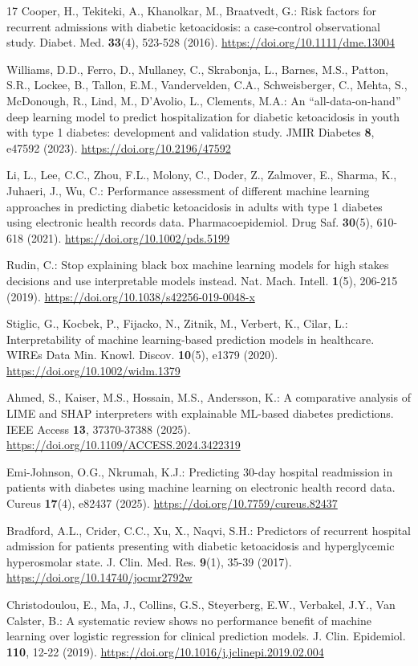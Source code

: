 \documentclass[pdflatex,sn-basic,Numbered]{sn-jnl}
\begin{document}
\begin{thebibliography}{17}
 Cooper, H., Tekiteki, A., Khanolkar, M., Braatvedt, G.: Risk factors for recurrent admissions with diabetic ketoacidosis: a case-control observational study. Diabet. Med. \textbf{33}(4), 523-528 (2016). \url{https://doi.org/10.1111/dme.13004}

 Williams, D.D., Ferro, D., Mullaney, C., Skrabonja, L., Barnes, M.S., Patton, S.R., Lockee, B., Tallon, E.M., Vandervelden, C.A., Schweisberger, C., Mehta, S., McDonough, R., Lind, M., D'Avolio, L., Clements, M.A.: An ``all-data-on-hand'' deep learning model to predict hospitalization for diabetic ketoacidosis in youth with type 1 diabetes: development and validation study. JMIR Diabetes \textbf{8}, e47592 (2023). \url{https://doi.org/10.2196/47592}

 Li, L., Lee, C.C., Zhou, F.L., Molony, C., Doder, Z., Zalmover, E., Sharma, K., Juhaeri, J., Wu, C.: Performance assessment of different machine learning approaches in predicting diabetic ketoacidosis in adults with type 1 diabetes using electronic health records data. Pharmacoepidemiol. Drug Saf. \textbf{30}(5), 610-618 (2021). \url{https://doi.org/10.1002/pds.5199}

 Rudin, C.: Stop explaining black box machine learning models for high stakes decisions and use interpretable models instead. Nat. Mach. Intell. \textbf{1}(5), 206-215 (2019). \url{https://doi.org/10.1038/s42256-019-0048-x}

 Stiglic, G., Kocbek, P., Fijacko, N., Zitnik, M., Verbert, K., Cilar, L.: Interpretability of machine learning-based prediction models in healthcare. WIREs Data Min. Knowl. Discov. \textbf{10}(5), e1379 (2020). \url{https://doi.org/10.1002/widm.1379}

 Ahmed, S., Kaiser, M.S., Hossain, M.S., Andersson, K.: A comparative analysis of LIME and SHAP interpreters with explainable ML-based diabetes predictions. IEEE Access \textbf{13}, 37370-37388 (2025). \url{https://doi.org/10.1109/ACCESS.2024.3422319}

 Emi-Johnson, O.G., Nkrumah, K.J.: Predicting 30-day hospital readmission in patients with diabetes using machine learning on electronic health record data. Cureus \textbf{17}(4), e82437 (2025). \url{https://doi.org/10.7759/cureus.82437}

 Bradford, A.L., Crider, C.C., Xu, X., Naqvi, S.H.: Predictors of recurrent hospital admission for patients presenting with diabetic ketoacidosis and hyperglycemic hyperosmolar state. J. Clin. Med. Res. \textbf{9}(1), 35-39 (2017). \url{https://doi.org/10.14740/jocmr2792w}

 Christodoulou, E., Ma, J., Collins, G.S., Steyerberg, E.W., Verbakel, J.Y., Van Calster, B.: A systematic review shows no performance benefit of machine learning over logistic regression for clinical prediction models. J. Clin. Epidemiol. \textbf{110}, 12-22 (2019). \url{https://doi.org/10.1016/j.jclinepi.2019.02.004}

\end{thebibliography}
\end{document}
